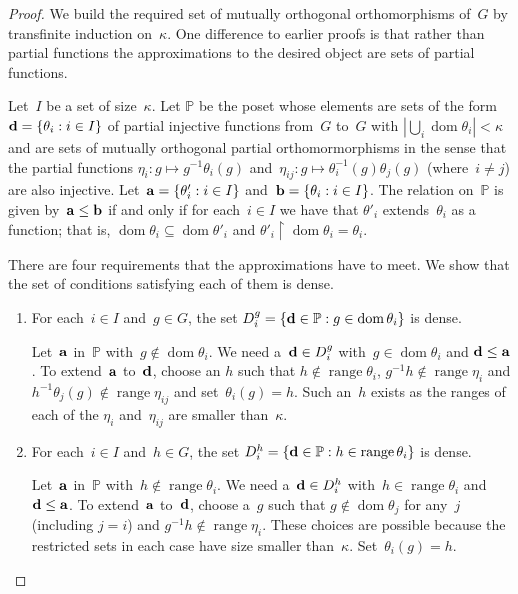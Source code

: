 \documentclass[12pt,a4paper]{article}
\DeclareMathOperator{\dom}{dom}
\DeclareMathOperator{\ran}{range}
\newcommand{\rest}{\mathbin{\upharpoonright}}
\renewcommand{\P}{\mathbb{P}}
\renewcommand{\a}{\textup{\textbf{a}}}
\renewcommand{\b}{\textup{\textbf{b}}}
\renewcommand{\d}{\textup{\textbf{d}}}
\begin{document}
\begin{proof}
We build the required set of mutually orthogonal orthomorphisms of~$G$ by transfinite induction on~$\kappa$.  One difference to earlier proofs is that rather than partial functions the approximations to the desired object are sets of partial functions.

Let~$I$ be a set of size~$\kappa$.  Let $\P$ be the poset whose elements are sets of the form~$\d=\{ \theta_i : i \in I \}$ of partial injective functions from~$G$ to~$G$ with $|\bigcup_{i} \dom \theta_i|  < \kappa$ and are sets of mutually orthogonal partial orthomormorphisms in the sense that the partial functions $\eta_i: g \mapsto g^{-1}\theta_i(g)$ and~$\eta_{ij}: g \mapsto \theta_i^{-1}(g)\theta_j(g)$ (where~$i \neq j$) are also injective.  Let~$\a = \{ \theta'_i : i \in I \}$ and~$\b = \{ \theta_i : i \in I \}$.
The relation on~$\P$ is given by~$\a \leq \b$ if and only if for each~$i \in I$ we have that $\theta'_i$ extends~$\theta_i$ as a function;  that is,  $\dom \theta_i \subseteq \dom \theta'_i$ and $\theta'_i \rest \dom \theta_i = \theta_i$.


There are four requirements that the approximations have to meet.  We show that the set of conditions satisfying each of them is dense.

\begin{enumerate}

\item For each~$i \in I$ and~$g \in G$, the set $D_i^g = \{ {\bf d} \in \P : g \in \dom \theta_i \}$ is dense.

Let~${\bf a}$ in~$\P$ with~$g \not\in \dom \theta_i$.  We need a~${\bf d} \in D_i^g$ with~$g \in \dom \theta_i$ and ${\bf d} \leq {\bf a}$.  To extend~${\bf a}$ to~${\bf d}$, choose an $h$ such that $h \not\in \ran \theta_i$, $g^{-1}h \not\in \ran \eta_i$ and $h^{-1}\theta_j(g) \not\in \ran \eta_{ij}$ and set~$\theta_i(g) = h$.  Such an~$h$ exists as the ranges of each of the $\eta_i$ and~$\eta_{ij}$ are smaller than~$\kappa$.


\item For each~$i \in I$ and~$h \in G$, the set $D_i^h = \{ {\bf d} \in \P : h \in \ran \theta_i \}$ is dense.

Let~${\bf a}$ in~$\P$ with~$h \not\in \ran \theta_i$.  We need a~${\bf d} \in D_i^h$ with~$h \in \ran \theta_i$ and ${\bf d} \leq {\bf a}$.  To extend~${\bf a}$ to~${\bf d}$, choose a~$g$ such that $g \not\in \dom \theta_j$ for any~$j$ (including $j=i$) and $g^{-1}h \not\in \ran \eta_i$.  These choices are possible because the restricted sets in each case have size smaller than~$\kappa$.
Set~$\theta_i(g) = h$.


\end{enumerate}
\end{proof}
\end{document}
